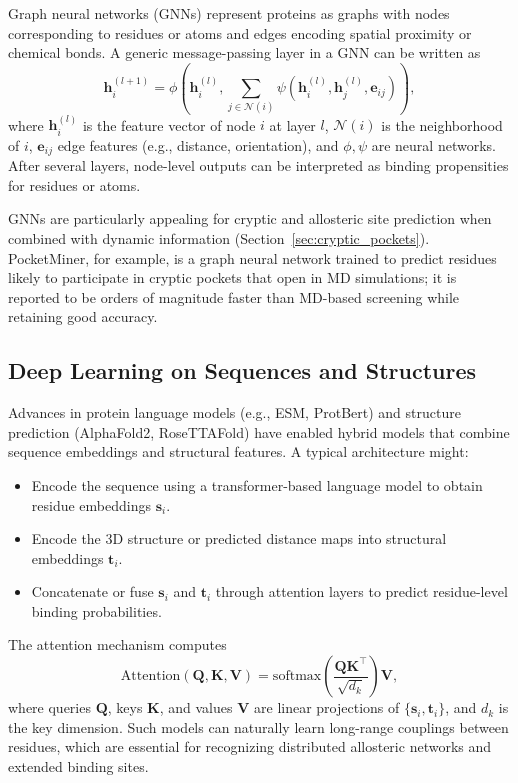 \documentclass[12pt,a4paper]{article}
\begin{document}
Graph neural networks (GNNs) represent proteins as graphs with nodes corresponding to residues or atoms and edges encoding spatial proximity or chemical bonds.\cite{CH5_mou2025deep,CH5_meller2023predicting} A generic message-passing layer in a GNN can be written as
\begin{equation}
\mathbf{h}_i^{(l+1)} = \phi \left( \mathbf{h}_i^{(l)}, \sum_{j \in \mathcal{N}(i)} \psi \left( \mathbf{h}_i^{(l)}, \mathbf{h}_j^{(l)}, \mathbf{e}_{ij} \right) \right),
\label{eq:gnn}
\end{equation}
where \(\mathbf{h}_i^{(l)}\) is the feature vector of node \(i\) at layer \(l\), \(\mathcal{N}(i)\) is the neighborhood of \(i\), \(\mathbf{e}_{ij}\) edge features (e.g., distance, orientation), and \(\phi, \psi\) are neural networks. After several layers, node-level outputs can be interpreted as binding propensities for residues or atoms.

GNNs are particularly appealing for cryptic and allosteric site prediction when combined with dynamic information (Section~\ref{sec:cryptic_pockets}). PocketMiner, for example, is a graph neural network trained to predict residues likely to participate in cryptic pockets that open in MD simulations; it is reported to be orders of magnitude faster than MD-based screening while retaining good accuracy.\cite{CH5_meller2023predicting}

\subsection{Deep Learning on Sequences and Structures}

Advances in protein language models (e.g., ESM, ProtBert) and structure prediction (AlphaFold2, RoseTTAFold) have enabled hybrid models that combine sequence embeddings and structural features.\cite{CH5_mou2025deep} A typical architecture might:
\begin{itemize}
    \item Encode the sequence using a transformer-based language model to obtain residue embeddings \(\mathbf{s}_i\).
    \item Encode the 3D structure or predicted distance maps into structural embeddings \(\mathbf{t}_i\).
    \item Concatenate or fuse \(\mathbf{s}_i\) and \(\mathbf{t}_i\) through attention layers to predict residue-level binding probabilities.
\end{itemize}
The attention mechanism computes
\begin{equation}
\mathrm{Attention}(\mathbf{Q}, \mathbf{K}, \mathbf{V}) = \mathrm{softmax} \left( \frac{\mathbf{Q}\mathbf{K}^\top}{\sqrt{d_k}} \right) \mathbf{V},
\label{eq:attention}
\end{equation}
where queries \(\mathbf{Q}\), keys \(\mathbf{K}\), and values \(\mathbf{V}\) are linear projections of \(\{\mathbf{s}_i, \mathbf{t}_i\}\), and \(d_k\) is the key dimension. Such models can naturally learn long-range couplings between residues, which are essential for recognizing distributed allosteric networks and extended binding sites.\cite{CH5_mou2025deep}
\end{document}
